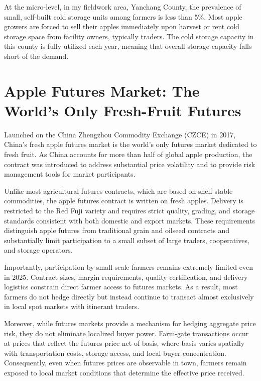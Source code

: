 At the micro-level, in my fieldwork area, Yanchang County, the prevalence of small, self-built cold storage units among farmers is less than 5\%. Most apple growers are forced to sell their apples immediately upon harvest or rent cold storage space from facility owners, typically traders. The cold storage capacity in this county is fully utilized each year, meaning that overall storage capacity falls short of the demand.
    







\section{Apple Futures Market: The World's Only Fresh-Fruit Futures}
\noindent
Launched on the China Zhengzhou Commodity Exchange (CZCE) in 2017, China's fresh apple futures market is the world's only futures market dedicated to fresh fruit. As China accounts for more than half of global apple production, the contract was introduced to address substantial price volatility and to provide risk management tools for market participants.

Unlike most agricultural futures contracts, which are based on shelf-stable commodities, the apple futures contract is written on fresh apples. Delivery is restricted to the Red Fuji variety and requires strict quality, grading, and storage standards consistent with both domestic and export markets. These requirements distinguish apple futures from traditional grain and oilseed contracts and substantially limit participation to a small subset of large traders, cooperatives, and storage operators.

Importantly, participation by small-scale farmers remains extremely limited even in 2025. Contract sizes, margin requirements, quality certification, and delivery logistics constrain direct farmer access to futures markets. As a result, most farmers do not hedge directly but instead continue to transact almost exclusively in local spot markets with itinerant traders.

Moreover, while futures markets provide a mechanism for hedging aggregate price risk, they do not eliminate localized buyer power. Farm-gate transactions occur at prices that reflect the futures price net of basis, where basis varies spatially with transportation costs, storage access, and local buyer concentration. Consequently, even when futures prices are observable in town, farmers remain exposed to local market conditions that determine the effective price received.

